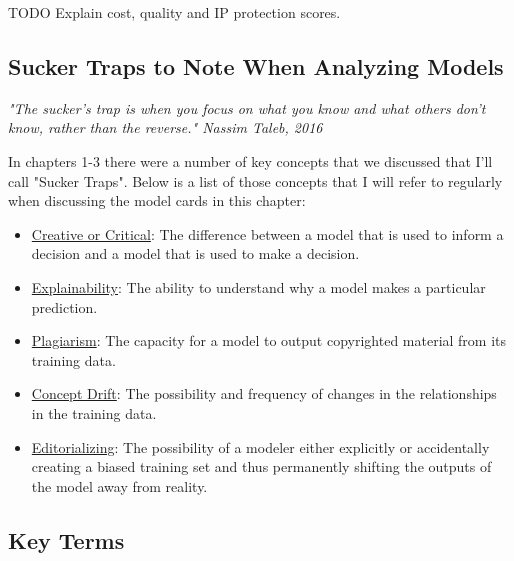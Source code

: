 TODO Explain cost, quality and IP protection scores.

\subsection{Sucker Traps to Note When Analyzing Models}

\textit{"The sucker's trap is when you focus on what you know and what others don't know, rather than the reverse." Nassim Taleb, 2016}\cite{procrustes}

In chapters 1-3 there were a number of key concepts that we discussed that I'll call "Sucker Traps". Below is a list of those concepts that I will refer to regularly when discussing the model cards in this chapter:

\begin{itemize}
    \item \hyperref[sec:creative]{Creative or Critical}: The difference between a model that is used to inform a decision and a model that is used to make a decision.
    \item \hyperref[sec:explain]{Explainability}: The ability to understand why a model makes a particular prediction.
    \item \hyperref[sec:plag]{Plagiarism}: The capacity for a model to output copyrighted material from its training data.
    \item \hyperref[sec:drift]{Concept Drift}: The possibility and frequency of changes in the relationships in the training data.
    \item \hyperref[sec:janitor]{Editorializing}: The possibility of a modeler either explicitly or accidentally creating a biased training set and thus permanently shifting the outputs of the model away from reality.
\end{itemize}

\subsection{Key Terms}

